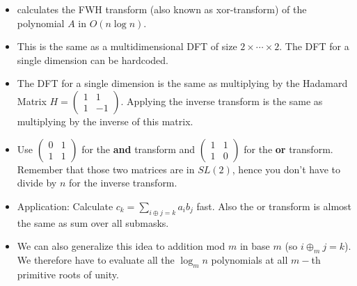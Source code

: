 \begin{itemize}
	\item calculates the FWH transform (also known as xor-transform) of the polynomial $A$ in $O(n\log n)$.
  \item This is the same as a multidimensional DFT of size $2\times\cdots\times2$. The DFT for a single dimension can be hardcoded.
  \item The DFT for a single dimension is the same as multiplying by the Hadamard Matrix $H = \begin{pmatrix}1 & 1\\1 & -1\end{pmatrix}$. Applying the inverse transform is the same as multiplying by the inverse of this matrix.
  \item Use $\begin{pmatrix}0 & 1\\1 & 1\end{pmatrix}$ for the \textbf{and} transform and $\begin{pmatrix}1 & 1\\1 & 0\end{pmatrix}$ for the \textbf{or} transform. Remember that those two matrices are in $SL(2)$, hence you don't have to divide by $n$ for the inverse transform.
  \item Application: Calculate $c_k = \sum_{i\oplus j=k} a_ib_j$ fast. Also the or transform is almost the same as sum over all submasks.
  \item We can also generalize this idea to addition mod $m$ in base $m$ (so $i\oplus_mj=k$). We therefore have to evaluate all the $\log_m n$ polynomials at all $m-$th primitive roots of unity.
\end{itemize}